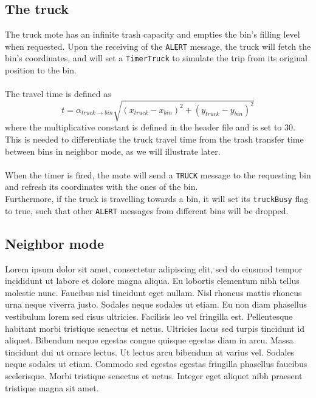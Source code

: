 \documentclass[]{article}
\begin{document}
\subsection{The truck}
The truck mote has an infinite trash capacity and empties the bin's filling level when requested. Upon the receiving of the \texttt{ALERT} message, the truck will fetch the bin's coordinates, and will set a \texttt{TimerTruck} to simulate the trip from its original position to the bin. \\\\
The travel time is defined as
$$t = \alpha_{truck\rightarrow bin}\sqrt{\displaystyle(x_{truck} - x_{bin})^2 + (y_{truck} - y_{bin})^2}$$
where the multiplicative constant is defined in the header file and is set to 30.  This is needed to differentiate the truck travel time from the trash transfer time between bins in neighbor mode, as we will illustrate later. \\\\
When the timer is fired, the mote will send a \texttt{TRUCK} message to the requesting bin and refresh its coordinates with the ones of the bin.\\Furthermore, if the truck is travelling towards a bin, it will set its \texttt{truckBusy} flag to true, such that other \texttt{ALERT} messages from different bins will be dropped.
\subsection{Neighbor mode}
Lorem ipsum dolor sit amet, consectetur adipiscing elit, sed do eiusmod tempor incididunt ut labore et dolore magna aliqua. Eu lobortis elementum nibh tellus molestie nunc. Faucibus nisl tincidunt eget nullam. Nisl rhoncus mattis rhoncus urna neque viverra justo. Sodales neque sodales ut etiam. Eu non diam phasellus vestibulum lorem sed risus ultricies. Facilisis leo vel fringilla est. Pellentesque habitant morbi tristique senectus et netus. Ultricies lacus sed turpis tincidunt id aliquet. Bibendum neque egestas congue quisque egestas diam in arcu. Massa tincidunt dui ut ornare lectus. Ut lectus arcu bibendum at varius vel. Sodales neque sodales ut etiam. Commodo sed egestas egestas fringilla phasellus faucibus scelerisque. Morbi tristique senectus et netus. Integer eget aliquet nibh praesent tristique magna sit amet.
\end{document}
